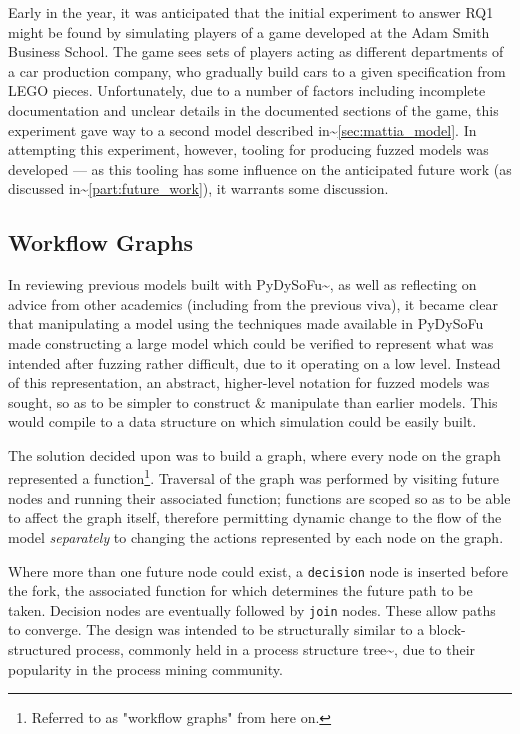 \documentclass[11pt]{article}
\newcommand{\ampersand}{\&}
\begin{document}
Early in the year, it was anticipated that the initial experiment to answer RQ1
might be found by simulating players of a game developed at the Adam Smith
Business School. The game sees sets of players acting as different departments
of a car production company, who gradually build cars to a given specification
from LEGO pieces\cite{qpq_game}. Unfortunately, due to a number of factors
including incomplete documentation and unclear details in the documented
sections of the game, this experiment gave way to a second model described
in\textasciitilde{}\cref{sec:mattia_model}. In attempting this experiment, however, tooling for
producing fuzzed models was developed --- as this tooling has some influence on
the anticipated future work (as discussed in\textasciitilde{}\cref{part:future_work}), it
warrants some discussion.

\subsection{Workflow Graphs}
\label{sec:orgcb388c5}
\label{subsec:workflow_graphs}

In reviewing previous models built with PyDySoFu\textasciitilde{}\cite{pdsf_paper}, as well as
reflecting on advice from other academics (including from the previous viva), it
became clear that manipulating a model using the techniques made available in
PyDySoFu made constructing a large model which could be verified to represent
what was intended after fuzzing rather difficult, due to it operating on a low
level. Instead of this representation, an abstract, higher-level notation for
fuzzed models was sought, so as to be simpler to construct \ampersand{} manipulate than
earlier models. This would compile to a data structure on which simulation could
be easily built.

The solution decided upon was to build a graph, where every node on the graph
represented a function\footnote{Referred to as "workflow graphs" from here on.}.
Traversal of the graph was performed by visiting future nodes and running their
associated function; functions are scoped so as to be able to affect the graph
itself, therefore permitting dynamic change to the flow of the model
\emph{separately} to changing the actions represented by each node on the graph.

Where more than one future node could exist, a \texttt{decision} node is inserted
before the fork, the associated function for which determines the future path to
be taken. Decision nodes are eventually followed by \texttt{join} nodes. These allow
paths to converge. The design was intended to be structurally similar to a
block-structured process, commonly held in a process structure
tree\textasciitilde{}\cite{thesis_process_structure_trees}, due to their popularity in the
process mining community.
\end{document}
